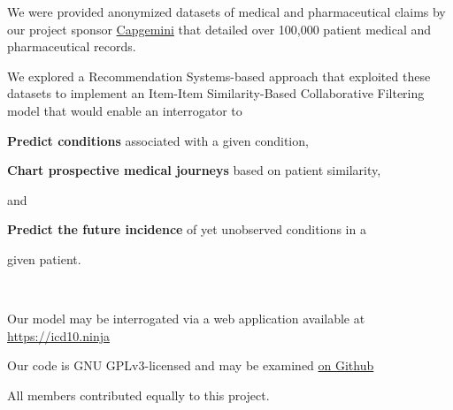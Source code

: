 \documentclass[twoside,11pt]{article}
\newcommand*\circled[1]{\tikz[baseline=(char.base)]{
            \node[shape=circle,draw,inner sep=1pt] (char) {#1};}}
\begin{document}
\begin{adjustwidth}{50pt}{50pt}
\Large{

We were provided anonymized datasets of medical and pharmaceutical claims by our project sponsor \href{https://www.capgemini.com/us-en/}{Capgemini} that detailed over 100,000 patient medical and pharmaceutical records.

We explored a Recommendation Systems-based approach that exploited these datasets to implement an Item-Item Similarity-Based Collaborative Filtering model that would enable an interrogator to

\vspace{1em}

\begin{adjustwidth}{-1.25em}{}
\circled{1} \textbf{Predict conditions} associated with a given condition,
\end{adjustwidth}

\begin{adjustwidth}{-1.25em}{}
\circled{2} \textbf{Chart prospective medical journeys} based on patient similarity,
\begin{adjustwidth}{1.4em}{}
and
\end{adjustwidth}
\end{adjustwidth}

\begin{adjustwidth}{-1.125em}{}
\circled{3} \textbf{Predict the future incidence} of yet unobserved conditions in a 
  \begin{adjustwidth}{1.4em}{}
  given patient.
  \end{adjustwidth}
\end{adjustwidth}

\

Our model may be interrogated via a web application available at \\
\href{https://icd10.ninja}{https://icd10.ninja}

Our code is GNU GPLv3-licensed and may be examined \href{https://github.com/afreeorange/ISYE6748}{on Github}
}

\end{adjustwidth}

\vspace*{\fill}

\begin{center}
	\small{All members contributed equally to this project.}
\end{center}

\end{document}
